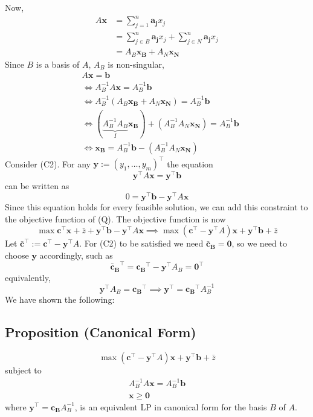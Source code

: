 Now,
\begin{align*}
    A\bm{x}
    &=\sum_{j = 1}^{n}\bm{a_j}x_j\\
    &=\sum_{j\in B}^{n}\bm{a_j}x_j+\sum_{j\in N}^{n}\bm{a_j}x_j\\
    &=A_B \bm{x_B}+A_N \bm{x_N}
\end{align*}
Since $B$ is a basis of $A$, $A_B$ is non-singular,
\begin{align*}
    &A\bm{x}=\bm{b}\\
    &\iff
    A_B^{-1}A\bm{x}=A_B^{-1}\bm{b}\\
    &\iff
    A_B^{-1}(A_B\bm{x_B}+A_N\bm{x_N})=A_B^{-1}\bm{b}\\
    &\iff
    (\underbrace{A_B^{-1} A_B}_{I}\bm{x_B})+
    (A_B^{-1} A_N\bm{x_N})=A_B^{-1}\bm{b}\\
    &\iff
    \bm{x_B}=A_B^{-1}\bm{b}-(A_B^{-1} A_N\bm{x_N})
\end{align*}
Consider (C2). For any $\bm{y}:=(y_1,\dots, y_m)^\top$
the equation
\[\bm{y}^\top A\bm{x}=\bm{y}^\top \bm{b}\]
can be written as
\[0=\bm{y}^\top \bm{b}-\bm{y}^\top A\bm{x}\]
Since  this  equation  holds  for  every  feasible  solution,  we  can  add  this 
constraint to the objective function of (Q). The objective function is now
\[\max \bm{c}^\top  \bm{x}+\bar{z}+\bm{y}^\top \bm{b}-\bm{y}^\top A\bm{x}
\implies
\max (\bm{c}^\top -\bm{y}^\top A)\bm{x}+\bm{y}^\top \bm{b}+\bar{z}\]
Let $\bm{\bar{c}}^\top :=\bm{c}^\top -\bm{y}^\top A$. For (C2) to be satisfied we need
$\bm{\bar{c}_B}=\bm{0}$, so we need to choose $\bm{y}$ accordingly, such as
\[\bm{\bar{c}_B}^\top =\bm{c_B}^\top -\bm{y}^\top A_B=\bm{0}^\top \]
equivalently,
\[\bm{y}^\top A_B=\bm{c_B}^\top 
\implies
\bm{y}^\top =\bm{c_B}^\top A_B^{-1}\]
We have shown the following:


\begin{thmbox}
    \subsection{Proposition (Canonical Form)}
    \[\max (\bm{c}^\top -\bm{y}^\top A)\bm{x}+\bm{y}^\top \bm{b}+\bar{z}\]
    subject to
    \begin{align*}
        A_B^{-1}A\bm{x}=A_B^{-1}\bm{b}\\
        \bm{x}\ge \bm{0}
    \end{align*}
    where $\bm{y}^\top =\bm{c_B}A_B^{-1}$, is an equivalent LP in canonical form for the 
    basis $B$ of $A$.
\end{thmbox}


